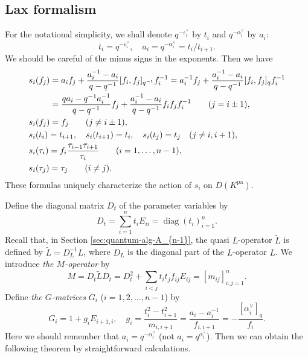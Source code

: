 \documentclass[12pt,twoside]{article}
\newcommand\tL{{\widetilde L}}
\newcommand\av{\alpha^\vee}
\newcommand\eps{\varepsilon}
\newcommand\epsv{\eps^\vee}
\newcommand\pa{{\mathrm{pa}}}
\newcommand\diag{\mathop{\mathrm{diag}}\nolimits}
\theoremstyle{plain} %
\theoremstyle{definition} %
\theoremstyle{definition} %
\numberwithin{theorem}{section}
\numberwithin{equation}{section}
\numberwithin{figure}{section}
\numberwithin{table}{section}
\newcommand\secref[1]{Section \ref{#1}}
\begin{document}

\subsection{Lax formalism}
\label{sec:Lax-A_{n-1}}

For the notational simplicity, we shall denote $q^{-\epsv_i}$ by $t_i$
and $q^{-\av_i}$ by $a_i$:
\begin{equation*}
 t_i = q^{-\epsv_i}, \quad 
 a_i = q^{-\av_i} = t_i/t_{i+1}.
\end{equation*}
We should be careful of the minus signs in the exponents. 
Then we have
\begin{align}
  &
  s_i(f_j)
  = a_i      f_j + \frac{a_i^{-1}-a_i}{q-q^{-1}} [f_i,f_j]_{q^{-1}} f_i^{-1}
  = a_i^{-1} f_j + \frac{a_i^{-1}-a_i}{q-q^{-1}} [f_i,f_j]_q        f_i^{-1}
 \notag
 \\ &
  \hphantom{s_i(f_j)}
  = \frac{q a_i-q^{-1}a_i^{-1}}{q-q^{-1}} f_j 
  + \frac{a_i^{-1}-a_i}{q-q^{-1}} f_i f_j f_i^{-1}
  \qquad (j=i\pm1), 
 \label{eq:s_i(f_j)-1}
 \\ &
  s_i(f_j) = f_j 
  \qquad (j\ne i\pm 1),
 \label{eq:s_i(f_j)-2}
 \\ &
  s_i(t_i) = t_{i+1}, \quad
  s_i(t_{i+1}) = t_i, \quad
  s_i(t_j) = t_j \quad (j\ne i,i+1),
 \label{eq:s_i(t_j)}
 \\ &
  s_i(\tau_i) 
  = f_i\frac{\tau_{i-1}\tau_{i+1}}{\tau_i} 
  \qquad (i=1,\ldots,n-1),
 \notag
 \\ & 
  s_i(\tau_j) = \tau_j
  \qquad (i\ne j).
 \notag 
\end{align}
These formulas uniquely characterize the action of $s_i$ on $D(K^\pa)$.

Define the diagonal matrix $D_t$ of the parameter variables by 
\begin{equation*}
 D_t = \sum_{i=1}^n t_i E_{ii} = \diag(t_i)_{i=1}^n.
\end{equation*}
Recall that, in \secref{sec:quantum-alg-A_{n-1}}, 
the quasi $L$-operator $\tL$ is defined by $\tL=D_L^{-1}L$, 
where $D_L$ is the diagonal part of the $L$-operator $L$.
We introduce {\em the $M$-operator} by
\begin{equation*}
 M = D_t \tL D_t 
   = D_t^2 + \sum_{i<j}t_i t_j f_{ij}E_{ij}
   = [m_{ij}]_{i,j=1}^n.
\end{equation*}
Define {\em the $G$-matrices} $G_i$ ($i=1,2,\ldots,n-1$) by
\begin{equation*}
 G_i = 1 + g_i E_{i+1,i}, \quad
 g_i = \frac{t_i^2-t_{i+1}^2}{m_{i,i+1}}
     = \frac{a_i-a_i^{-1}}{f_{i,i+1}}
     = -\frac{[\av_i]_q}{f_i}.
\end{equation*}
Here we should remember that $a_i=q^{-\av_i}$ (not $a_i=q^{\av_i}$).
Then we can obtain the following theorem by straightforward calculations.
\end{document}
